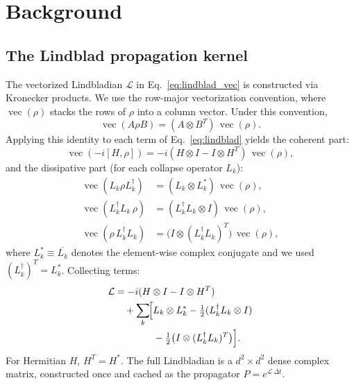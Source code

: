 \documentclass[a4paper,noarxiv]{quantumarticle}
\begin{document}
\section{Background}
\label{sec:background}

\subsection{The Lindblad propagation kernel}
\label{sec:kernel}

The vectorized Lindbladian $\mathcal{L}$ in Eq.~\eqref{eq:lindblad_vec} is
constructed via Kronecker products. We use the row-major vectorization
convention, where $\operatorname{vec}(\rho)$ stacks the rows of $\rho$ into
a column vector. Under this convention,
\begin{equation}
  \operatorname{vec}(A \rho B) = (A \otimes B^T)\,\operatorname{vec}(\rho).
\end{equation}
Applying this identity to each term of
Eq.~\eqref{eq:lindblad} yields the coherent part:
\begin{equation}
  \operatorname{vec}(-i[H, \rho])
    = -i(H \otimes I - I \otimes H^T)\,\operatorname{vec}(\rho),
\end{equation}
and the dissipative part (for each collapse operator $L_k$):
\begin{align}
  \operatorname{vec}(L_k \rho L_k^\dagger)
    &= (L_k \otimes L_k^*)\,\operatorname{vec}(\rho), \\
  \operatorname{vec}(L_k^\dagger L_k\,\rho)
    &= (L_k^\dagger L_k \otimes I)\,\operatorname{vec}(\rho), \\
  \operatorname{vec}(\rho\,L_k^\dagger L_k)
    &= \bigl(I \otimes (L_k^\dagger L_k)^T\bigr)\,\operatorname{vec}(\rho),
\end{align}
where $L_k^* \equiv \overline{L_k}$ denotes the element-wise complex
conjugate and we used $(L_k^\dagger)^T = L_k^*$. Collecting terms:
\begin{align}
  \label{eq:lindbladian_kron}
  \mathcal{L} &= -i(H \otimes I - I \otimes H^T) \nonumber\\
    &\quad + \sum_k \!\Bigl[ L_k \otimes L_k^*
       - \tfrac{1}{2}(L_k^\dagger L_k \otimes I) \nonumber\\
    &\qquad\qquad - \tfrac{1}{2}\bigl(I \otimes (L_k^\dagger L_k)^T
       \bigr) \Bigr].
\end{align}
For Hermitian $H$, $H^T = H^*$. The full Lindbladian is a
$d^2 \times d^2$ dense complex matrix, constructed once and cached as the
propagator $P = e^{\mathcal{L}\,\Delta t}$.
\end{document}
